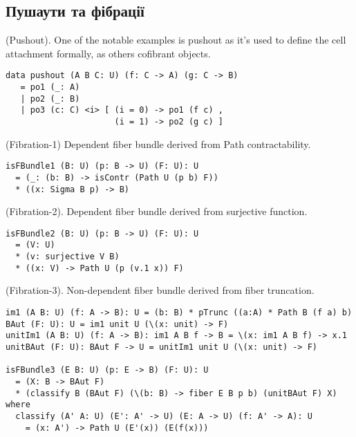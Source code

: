 \subsection{Пушаути та фібрації}

\begin{definition} (Pushout). One of the notable examples is pushout as it's used
to define the cell attachment formally, as others cofibrant objects.
\begin{lstlisting}
data pushout (A B C: U) (f: C -> A) (g: C -> B)
   = po1 (_: A)
   | po2 (_: B)
   | po3 (c: C) <i> [ (i = 0) -> po1 (f c) ,
                      (i = 1) -> po2 (g c) ]
\end{lstlisting}
\end{definition}

\begin{definition} (Fibration-1) Dependent fiber bundle derived from Path contractability.
\begin{lstlisting}
isFBundle1 (B: U) (p: B -> U) (F: U): U
  = (_: (b: B) -> isContr (Path U (p b) F))
  * ((x: Sigma B p) -> B)
\end{lstlisting}
\end{definition}

\begin{definition} (Fibration-2). Dependent fiber bundle derived from surjective function.
\begin{lstlisting}
isFBundle2 (B: U) (p: B -> U) (F: U): U
  = (V: U)
  * (v: surjective V B)
  * ((x: V) -> Path U (p (v.1 x)) F)
\end{lstlisting}
\end{definition}

\begin{definition} (Fibration-3). Non-dependent fiber bundle derived from fiber truncation.
\begin{lstlisting}
im1 (A B: U) (f: A -> B): U = (b: B) * pTrunc ((a:A) * Path B (f a) b)
BAut (F: U): U = im1 unit U (\(x: unit) -> F)
unitIm1 (A B: U) (f: A -> B): im1 A B f -> B = \(x: im1 A B f) -> x.1
unitBAut (F: U): BAut F -> U = unitIm1 unit U (\(x: unit) -> F)

isFBundle3 (E B: U) (p: E -> B) (F: U): U
  = (X: B -> BAut F)
  * (classify B (BAut F) (\(b: B) -> fiber E B p b) (unitBAut F) X) where
  classify (A' A: U) (E': A' -> U) (E: A -> U) (f: A' -> A): U
    = (x: A') -> Path U (E'(x)) (E(f(x)))
\end{lstlisting}
\end{definition}


